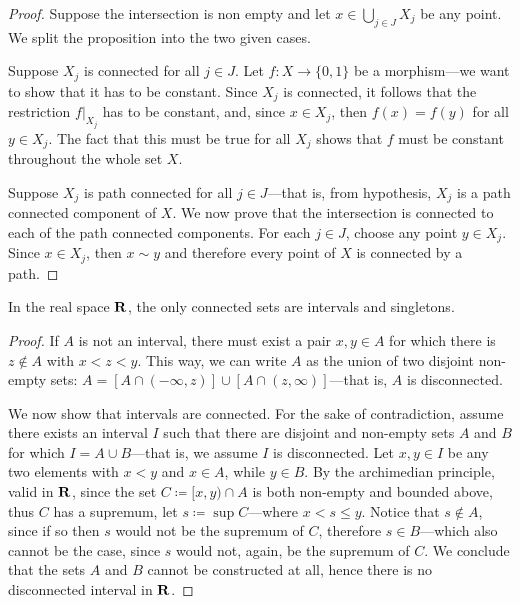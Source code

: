 \begin{proof}
    Suppose the intersection is non empty and let \(x \in \bigcup_{j \in J}
    X_j\) be any point. We split the proposition into the two given cases.

    Suppose \(X_j\) is connected for all \(j \in J\). Let \(f: X \to \{0, 1\}\) be a
    morphism---we want to show that it has to be constant. Since \(X_j\) is
    connected, it follows that the restriction \(f|_{X_j}\) has to be constant, and,
    since \(x \in X_j\), then \(f(x) = f(y)\) for all \(y \in X_j\). The fact that
    this must be true for all \(X_j\) shows that \(f\) must be constant throughout
    the whole set \(X\).

    Suppose \(X_j\) is path connected for all \(j \in J\)---that is, from
    hypothesis, \(X_j\) is a path connected component of \(X\). We now prove that
    the intersection is connected to each of the path connected components. For each
    \(j \in J\), choose any point \(y \in X_j\). Since \(x \in X_j\), then
    \(x \sim y\) and therefore every point of \(X\) is connected by a path.
\end{proof}

\begin{theorem}
    \label{thm:connected-interval-real-space}
    In the real space \(\mathbf{R}\), the only connected sets are intervals and singletons.
\end{theorem}

\begin{proof}
    If \(A\) is not an interval, there must exist a pair \(x, y \in A\) for which
    there is \(z \notin A\) with \(x < z < y\). This way, we can write \(A\) as the
    union of two disjoint non-empty sets:
    \(A = [A \cap (-\infty, z)] \cup [A \cap (z, \infty)]\)---that is, \(A\) is
    disconnected.

    We now show that intervals are connected. For the sake of contradiction, assume
    there exists an interval \(I\) such that there are disjoint and non-empty sets
    \(A\) and \(B\) for which \(I = A \cup B\)---that is, we assume \(I\) is
    disconnected. Let \(x, y \in I\) be any two elements with \(x < y\) and
    \(x \in A\), while \(y \in B\). By the archimedian principle, valid in \(\mathbf{R}\),
    since the set \(C \coloneq [x, y) \cap A\) is both non-empty and bounded above,
    thus \(C\) has a supremum, let \(s \coloneq \sup C\)---where \(x < s \leq
    y\). Notice that \(s \notin A\), since if so then \(s\) would not be the
    supremum of \(C\), therefore \(s \in B\)---which also cannot be the case,
    since \(s\) would not, again, be the supremum of \(C\). We conclude that the
    sets \(A\) and \(B\) cannot be constructed at all, hence there is no
    disconnected interval in \(\mathbf{R}\).
\end{proof}

